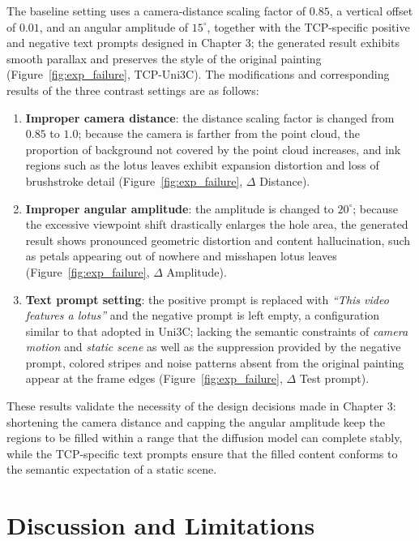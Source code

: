 The baseline setting uses a camera-distance scaling factor of $0.85$, a vertical offset of $0.01$,
and an angular amplitude of $15^\circ$,
together with the TCP-specific positive and negative text prompts designed in Chapter 3;
the generated result exhibits smooth parallax and preserves the style of the original painting (Figure~\ref{fig:exp_failure}, TCP-Uni3C).
The modifications and corresponding results of the three contrast settings are as follows:

\begin{enumerate}
  \item \textbf{Improper camera distance}:
        the distance scaling factor is changed from $0.85$ to $1.0$;
        because the camera is farther from the point cloud, the proportion of background not covered by the point cloud increases,
        and ink regions such as the lotus leaves exhibit expansion distortion and loss of brushstroke detail (Figure~\ref{fig:exp_failure}, $\Delta$ Distance).
  \item \textbf{Improper angular amplitude}:
        the amplitude is changed to $20^\circ$;
        because the excessive viewpoint shift drastically enlarges the hole area,
        the generated result shows pronounced geometric distortion and content hallucination,
        such as petals appearing out of nowhere and misshapen lotus leaves (Figure~\ref{fig:exp_failure}, $\Delta$ Amplitude).
  \item \textbf{Text prompt setting}:
        the positive prompt is replaced with \textit{``This video features a lotus''} and the negative prompt is left empty,
        a configuration similar to that adopted in Uni3C;
        lacking the semantic constraints of \textit{camera motion} and \textit{static scene} as well as the suppression provided by the negative prompt,
        colored stripes and noise patterns absent from the original painting appear at the frame edges (Figure~\ref{fig:exp_failure}, $\Delta$ Test prompt).
\end{enumerate}

These results validate the necessity of the design decisions made in Chapter 3:
shortening the camera distance and capping the angular amplitude
keep the regions to be filled within a range that the diffusion model can complete stably,
while the TCP-specific text prompts ensure that the filled content conforms to the semantic expectation of a static scene.

\section{Discussion and Limitations}
\label{sec:exp_discussion}

